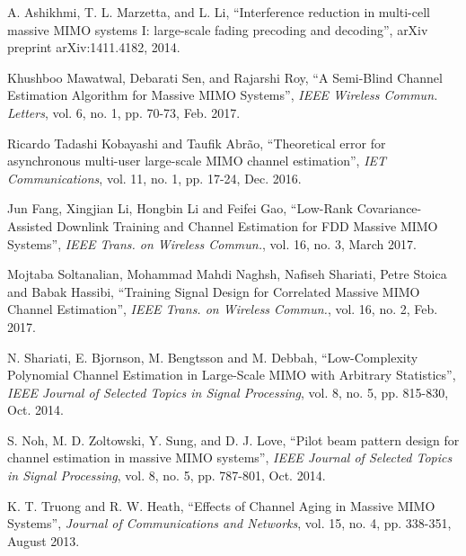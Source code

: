 \documentclass[10pt,journal,comsoc,final]{IEEEtran}
\begin{document}
\begin{thebibliography}{1}
A. Ashikhmi, T. L. Marzetta, and L. Li, \textquotedblleft{Interference reduction in multi-cell massive MIMO systems I: large-scale fading precoding and decoding\textquotedblright}, arXiv preprint arXiv:1411.4182, 2014.

Khushboo Mawatwal, Debarati Sen, and Rajarshi Roy, \textquotedblleft{A Semi-Blind Channel Estimation Algorithm for Massive MIMO Systems\textquotedblright}, \emph{IEEE Wireless Commun. Letters}, vol. 6, no. 1, pp. 70-73, Feb. 2017.

Ricardo Tadashi Kobayashi  and Taufik Abrão, \textquotedblleft{Theoretical error for asynchronous multi-user large-scale MIMO channel estimation\textquotedblright}, \emph{IET Communications}, vol. 11, no. 1, pp. 17-24, Dec. 2016.

Jun Fang, Xingjian Li, Hongbin Li and Feifei Gao, \textquotedblleft{Low-Rank Covariance-Assisted Downlink Training and Channel Estimation for FDD Massive MIMO Systems\textquotedblright}, \emph{IEEE Trans. on Wireless Commun.}, vol. 16, no. 3, March 2017.

Mojtaba Soltanalian, Mohammad Mahdi Naghsh, Nafiseh Shariati, Petre Stoica and Babak Hassibi, \textquotedblleft{Training Signal Design for Correlated Massive MIMO Channel Estimation\textquotedblright}, \emph{IEEE Trans. on Wireless Commun.}, vol. 16, no. 2, Feb. 2017.

N. Shariati, E. Bjornson, M. Bengtsson and M. Debbah, \textquotedblleft{Low-Complexity Polynomial Channel Estimation in Large-Scale MIMO with Arbitrary Statistics\textquotedblright}, \emph{IEEE Journal of Selected Topics in Signal Processing}, vol. 8, no. 5, pp. 815-830, Oct. 2014.

S. Noh, M. D. Zoltowski, Y. Sung, and D. J. Love, \textquotedblleft{Pilot beam pattern design for channel estimation in massive MIMO systems\textquotedblright}, \emph{IEEE Journal of Selected Topics in Signal Processing}, vol. 8, no. 5, pp. 787-801, Oct. 2014.

K. T. Truong and R. W. Heath, \textquotedblleft{Effects of Channel Aging in Massive MIMO Systems\textquotedblright}, \emph{Journal of Communications and Networks}, vol. 15, no. 4, pp. 338-351, August 2013.


\end{thebibliography}
\end{document}
